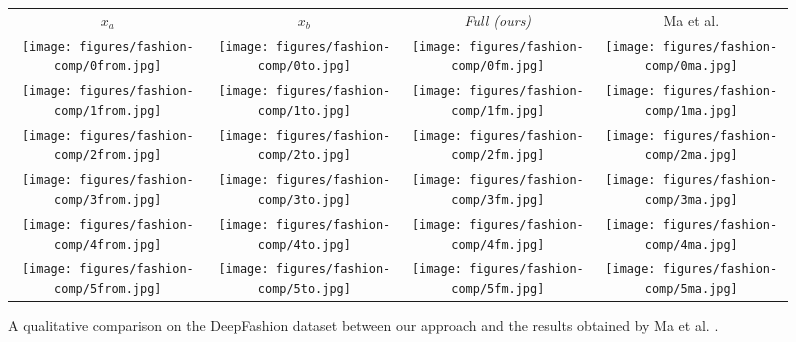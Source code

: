 \documentclass[10pt,twocolumn,letterpaper]{article}
\begin{document}
\begin{figure*}[h]
  \centering
  \setlength\tabcolsep{1.0pt}
\begin{tabular}{cccc}
$x_a$ & $x_b$ & \small\emph{Full (ours)}& Ma et al. \cite{ma2017pose}\\ 
\texttt{[image: figures/fashion-comp/0from.jpg]}
&\texttt{[image: figures/fashion-comp/0to.jpg]}
&\texttt{[image: figures/fashion-comp/0fm.jpg]}
&\texttt{[image: figures/fashion-comp/0ma.jpg]}
\\
\texttt{[image: figures/fashion-comp/1from.jpg]}
&\texttt{[image: figures/fashion-comp/1to.jpg]}
&\texttt{[image: figures/fashion-comp/1fm.jpg]}
&\texttt{[image: figures/fashion-comp/1ma.jpg]}
\\
\texttt{[image: figures/fashion-comp/2from.jpg]}
&\texttt{[image: figures/fashion-comp/2to.jpg]}
&\texttt{[image: figures/fashion-comp/2fm.jpg]}
&\texttt{[image: figures/fashion-comp/2ma.jpg]}
\\
\texttt{[image: figures/fashion-comp/3from.jpg]}
&\texttt{[image: figures/fashion-comp/3to.jpg]}
&\texttt{[image: figures/fashion-comp/3fm.jpg]}
&\texttt{[image: figures/fashion-comp/3ma.jpg]}
\\
\texttt{[image: figures/fashion-comp/4from.jpg]}
&\texttt{[image: figures/fashion-comp/4to.jpg]}
&\texttt{[image: figures/fashion-comp/4fm.jpg]}
&\texttt{[image: figures/fashion-comp/4ma.jpg]}\\
\texttt{[image: figures/fashion-comp/5from.jpg]}
&\texttt{[image: figures/fashion-comp/5to.jpg]}
&\texttt{[image: figures/fashion-comp/5fm.jpg]}
&\texttt{[image: figures/fashion-comp/5ma.jpg]}
\end{tabular}
  \caption{A qualitative comparison on the DeepFashion dataset between our approach and the results obtained by Ma et al. \cite{ma2017pose}.}
\label{fig:comparison-Fashion-1}
\end{figure*}
\end{document}
